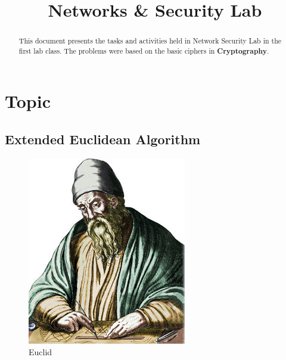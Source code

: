 \documentclass{article}
\begin{document}
\title{Networks \& Security Lab}
\author{}
\date{}
\maketitle

\begin{abstract}
This document presents the tasks and activities held in Network Security Lab in the first lab class. The problems were based on the basic ciphers in \textbf{Cryptography}.
\end{abstract}

\section{Topic}
	\subsection{Extended Euclidean Algorithm}
	
	\begin{figure}
	\includegraphics[width=\linewidth]{Euklid_von_Alexandria_1.jpg}
	\caption{Euclid}
	\label{fig : Euclid}
	\end{figure}
	
\end{document}
